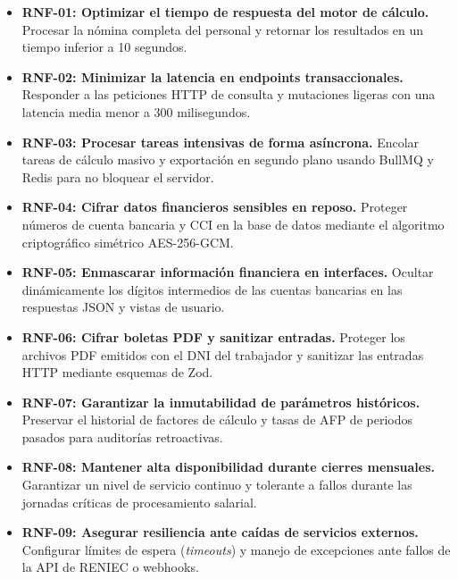 \begin{itemize}
    \item \textbf{RNF-01: Optimizar el tiempo de respuesta del motor de cálculo.} Procesar la nómina completa del personal y retornar los resultados en un tiempo inferior a 10 segundos.
    \item \textbf{RNF-02: Minimizar la latencia en endpoints transaccionales.} Responder a las peticiones HTTP de consulta y mutaciones ligeras con una latencia media menor a 300 milisegundos.
    \item \textbf{RNF-03: Procesar tareas intensivas de forma asíncrona.} Encolar tareas de cálculo masivo y exportación en segundo plano usando BullMQ y Redis para no bloquear el servidor.
    \item \textbf{RNF-04: Cifrar datos financieros sensibles en reposo.} Proteger números de cuenta bancaria y CCI en la base de datos mediante el algoritmo criptográfico simétrico AES-256-GCM.
    \item \textbf{RNF-05: Enmascarar información financiera en interfaces.} Ocultar dinámicamente los dígitos intermedios de las cuentas bancarias en las respuestas JSON y vistas de usuario.
    \item \textbf{RNF-06: Cifrar boletas PDF y sanitizar entradas.} Proteger los archivos PDF emitidos con el DNI del trabajador y sanitizar las entradas HTTP mediante esquemas de Zod.
    \item \textbf{RNF-07: Garantizar la inmutabilidad de parámetros históricos.} Preservar el historial de factores de cálculo y tasas de AFP de periodos pasados para auditorías retroactivas.
    \item \textbf{RNF-08: Mantener alta disponibilidad durante cierres mensuales.} Garantizar un nivel de servicio continuo y tolerante a fallos durante las jornadas críticas de procesamiento salarial.
    \item \textbf{RNF-09: Asegurar resiliencia ante caídas de servicios externos.} Configurar límites de espera (\textit{timeouts}) y manejo de excepciones ante fallos de la API de RENIEC o webhooks.
\end{itemize}